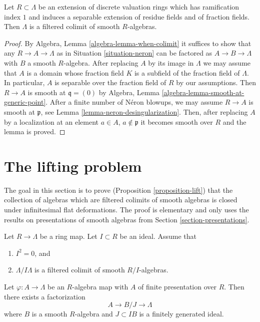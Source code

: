 \begin{lemma}
\label{lemma-neron-colimit}
Let $R \subset \Lambda$ be an extension of discrete valuation
rings which has ramification index $1$ and induces a separable
extension of residue fields and of fraction fields.
Then $\Lambda$ is a filtered colimit of smooth $R$-algebras.
\end{lemma}

\begin{proof}
By Algebra, Lemma \ref{algebra-lemma-when-colimit} it suffices to show
that any $R \to A \to \Lambda$ as in Situation \ref{situation-neron}
can be factored as $A \to B \to \Lambda$ with $B$ a
smooth $R$-algebra. After replacing $A$ by its image in $\Lambda$
we may assume that $A$ is a domain whose fraction field $K$
is a subfield of the fraction field of $\Lambda$.
In particular, $A$ is separable over the fraction field of $R$
by our assumptions. Then $R \to A$ is smooth at $\mathfrak q = (0)$ by
Algebra, Lemma \ref{algebra-lemma-smooth-at-generic-point}.
After a finite number of N\'eron blowups, we may assume $R \to A$
is smooth at $\mathfrak p$, see Lemma \ref{lemma-neron-desingularization}.
Then, after replacing $A$ by a localization
at an element $a \in A$, $a \not \in \mathfrak p$ it becomes
smooth over $R$ and the lemma is proved.
\end{proof}












\section{The lifting problem}
\label{section-lifting}

\noindent
The goal in this section is to prove (Proposition \ref{proposition-lift})
that the collection of algebras which are filtered colimits of smooth algebras
is closed under infinitesimal flat deformations. The proof is elementary
and only uses the results on presentations of smooth algebras from
Section \ref{section-presentations}.

\begin{lemma}
\label{lemma-lift-once}
Let $R \to \Lambda$ be a ring map. Let $I \subset R$ be an ideal.
Assume that
\begin{enumerate}
\item $I^2 = 0$, and
\item $\Lambda/I\Lambda$ is a filtered colimit of smooth $R/I$-algebras.
\end{enumerate}
Let $\varphi : A \to \Lambda$ be an $R$-algebra map with $A$ of finite
presentation over $R$. Then there exists a factorization
$$
A \to B/J \to \Lambda
$$
where $B$ is a smooth $R$-algebra and $J \subset IB$ is a finitely generated
ideal.
\end{lemma}

